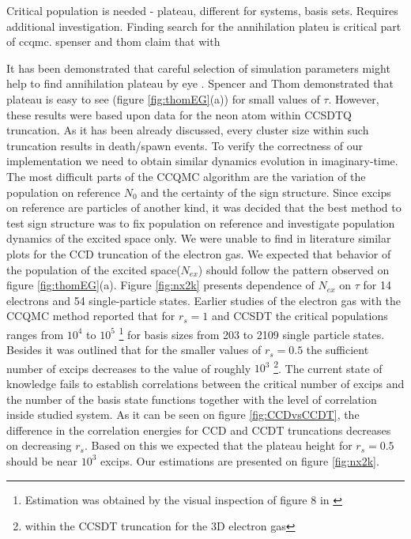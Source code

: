 \documentclass[twoside,english]{uiofysmaster}
\begin{document}


Critical population is needed  - plateau, different for systems, basis sets. Requires additional investigation.
Finding search for the annihilation plateu is critical part of ccqmc. spenser and thom claim that with 


It has been demonstrated that careful selection of simulation parameters might help to find annihilation plateau by eye \cite{SpencerDevelopmentsstochasticcoupled2016}. Spencer and Thom demonstrated that plateau is easy to see (figure \ref{fig:thomEG}(a)) for small values of $\tau$. However, these results were based upon data for the neon atom within CCSDTQ truncation. As it has been already discussed, every cluster size within such truncation results in death/spawn events. To verify the correctness of our implementation we need to obtain similar dynamics evolution in imaginary-time.
The most difficult parts of the CCQMC algorithm are the variation of the population on reference $N_0$ and the certainty of the sign structure. Since excips on reference are particles of another kind, it was decided that the best method to test sign structure was to fix population on reference and investigate population dynamics of the excited space only. We were unable to find in literature similar plots for the CCD truncation of the electron gas. We expected that behavior of the population of the excited space($N_{ex}$) should follow the pattern observed on figure \ref{fig:thomEG}(a). Figure \ref{fig:nx2k} presents dependence of $N_{ex}$ on $\tau$ for 14 electrons and 54 single-particle states. Earlier studies of the electron gas with the CCQMC method reported that for $r_s = 1$ and CCSDT the critical populations ranges from $10^4$ to $10^5$ \footnote{Estimation was obtained by the visual inspection of figure 8 in \cite{SpencerDevelopmentsstochasticcoupled2016}} for basis sizes from 203 to 2109 single particle states. Besides it was outlined that for the smaller values of $r_s=0.5$ the sufficient number of excips decreases to the value of roughly $10^3$ \footnote{within the CCSDT truncation for the 3D electron gas}. The current state of knowledge fails to establish correlations between the critical number of excips and the number of the basis state functions together with the level of correlation inside studied system. As it can be seen on figure \ref{fig:CCDvsCCDT}, the difference in the correlation energies for CCD and CCDT truncations decreases on decreasing $r_s$. Based on this we expected that the plateau height for $r_s=0.5$ should be near $10^3$ excips. Our estimations are presented on figure \ref{fig:nx2k}.
\end{document}
